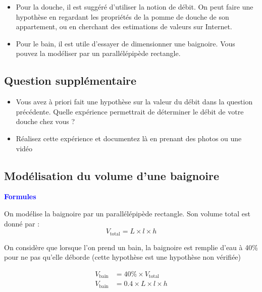 \documentclass[a4paper,12pt]{article}
\begin{document}
\begin{itemize}[noitemsep]
  \item Pour la douche, il est suggéré d'utiliser la notion de débit. On peut faire une hypothèse en regardant les propriétés de la pomme de douche de son appartement, ou en cherchant des estimations de valeurs sur Internet.
  \item Pour le bain, il est utile d'essayer de dimensionner une baignoire. Vous pouvez la modéliser par un parallélépipède rectangle.
\end{itemize}
\vspace{1em}


\subsection*{Question supplémentaire}

\begin{itemize}[noitemsep]
  \item Vous avez à priori fait une hypothèse sur la valeur du débit dans la question précédente. Quelle expérience permettrait de déterminer le débit de votre douche chez vous ?
  \item Réalisez cette expérience et documentez là en prenant des photos ou une vidéo 
\end{itemize}

\subsection*{Modélisation du volume d'une baignoire}

\textbf{\textcolor{blue}{Formules}} 

\vspace{1em}
On modélise la baignoire par un parallélépipède rectangle. Son volume total est donné par :
\begin{equation}
    V_{\text{total}} = L \times l \times h
\end{equation}

On considère que lorsque l'on prend un bain, la baignoire est remplie d'eau à 40\% pour ne pas qu'elle déborde (cette hypothèse est une hypothèse non vérifiée)

\begin{align}
  V_{\text{bain}} &= 40\% \times V_{\text{total}} \\
  V_{\text{bain}} &= 0.4 \times L \times l \times h
\end{align}

\vspace{1em}
\end{document}
